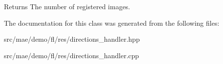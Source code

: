 \begin{DoxyReturn}{Returns}
The number of registered images. 
\end{DoxyReturn}


The documentation for this class was generated from the following files\-:\begin{DoxyCompactItemize}
\item 
src/mae/demo/fl/res/directions\-\_\-handler.\-hpp\item 
src/mae/demo/fl/res/directions\-\_\-handler.\-cpp\end{DoxyCompactItemize}
